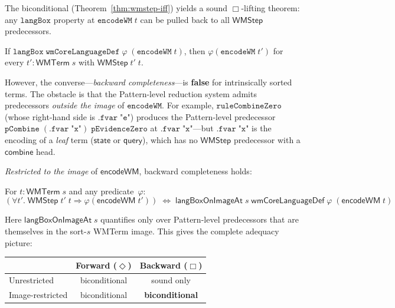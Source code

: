 \documentclass[11pt,openany]{report}
\begin{document}
The biconditional (Theorem~\ref{thm:wmstep-iff}) yields a sound
$\Box$-lifting theorem: any $\mathtt{langBox}$ property at
$\mathtt{encodeWM}\;t$ can be pulled back to all $\mathsf{WMStep}$
predecessors.

\begin{theorem}
If $\mathtt{langBox}\;\mathtt{wmCoreLanguageDef}\;\varphi\;(\mathtt{encodeWM}\;t)$,
then $\varphi(\mathtt{encodeWM}\;t')$ for every
$t' : \mathsf{WMTerm}\;s$ with $\mathsf{WMStep}\;t'\;t$.
\end{theorem}

\noindent
However, the converse---\emph{backward completeness}---is \textbf{false}
for intrinsically sorted terms.
The obstacle is that the Pattern-level reduction system admits
predecessors \emph{outside the image} of $\mathtt{encodeWM}$.
For example, $\mathtt{ruleCombineZero}$ (whose right-hand side is
$\mathtt{.fvar}\;\texttt{"e"}$) produces the Pattern-level predecessor
$\mathtt{pCombine}\;(\mathtt{.fvar}\;\texttt{"x"})\;\mathtt{pEvidenceZero}$
at $\mathtt{.fvar}\;\texttt{"x"}$---but $\mathtt{.fvar}\;\texttt{"x"}$
is the encoding of a \emph{leaf} term ($\mathsf{state}$ or
$\mathsf{query}$), which has no $\mathsf{WMStep}$ predecessor with a
$\mathsf{combine}$ head.

\emph{Restricted to the image} of $\mathsf{encodeWM}$, backward
completeness holds:

\begin{theorem}
\label{thm:box-image}
For $t : \mathsf{WMTerm}\;s$ and any predicate~$\varphi$:
\[
(\forall t'.\; \mathsf{WMStep}\;t'\;t \Rightarrow \varphi(\mathsf{encodeWM}\;t'))
\;\Leftrightarrow\;
\mathsf{langBoxOnImageAt}\;s\;\mathsf{wmCoreLanguageDef}\;\varphi\;
(\mathsf{encodeWM}\;t)
\]
\end{theorem}

\noindent
Here $\mathsf{langBoxOnImageAt}\;s$ quantifies only over Pattern-level
predecessors that are themselves in the sort-$s$ WMTerm image.  This gives
the complete adequacy picture:
\begin{center}
\begin{tabular}{lcc}
\toprule
& Forward ($\Diamond$) & Backward ($\Box$) \\
\midrule
Unrestricted & biconditional & sound only \\
Image-restricted & biconditional & \textbf{biconditional} \\
\bottomrule
\end{tabular}
\end{center}
\end{document}
